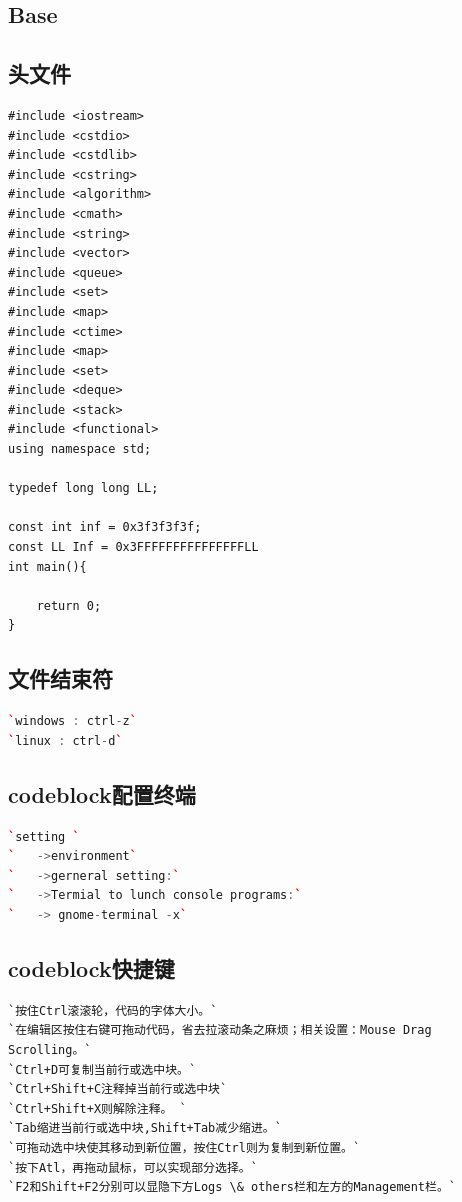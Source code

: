 \documentclass[a4paper]{article}
\begin{document}
\begin{CJK*}{UTF8}{gbsn}
\begin{multicols}{3}
\tableofcontents

\clearpage 

\begin{flushleft} 

% 
%
% 
%


\section{Base}
\subsection{头文件}

\begin{lstlisting}
#include <iostream>
#include <cstdio>
#include <cstdlib>
#include <cstring>
#include <algorithm>
#include <cmath>
#include <string>
#include <vector>
#include <queue>
#include <set>
#include <map>
#include <ctime>
#include <map>
#include <set>
#include <deque>
#include <stack>
#include <functional>
using namespace std;

typedef long long LL;

const int inf = 0x3f3f3f3f;
const LL Inf = 0x3FFFFFFFFFFFFFFFLL
int main(){

    return 0;
}
\end{lstlisting}

\subsection{文件结束符}
\begin{lstlisting}[language={c++}]
`windows : ctrl-z`
`linux : ctrl-d`
\end{lstlisting}

\subsection{codeblock配置终端}
\begin{lstlisting}[language={c++}]
`setting `
`	->environment`
`	->gerneral setting:`
`	->Termial to lunch console programs:`
`	-> gnome-terminal -x`
\end{lstlisting}

\subsection{codeblock快捷键}
\begin{lstlisting}
`按住Ctrl滚滚轮，代码的字体大小。`
`在编辑区按住右键可拖动代码，省去拉滚动条之麻烦；相关设置：Mouse Drag Scrolling。` 
`Ctrl+D可复制当前行或选中块。`
`Ctrl+Shift+C注释掉当前行或选中块`
`Ctrl+Shift+X则解除注释。 `
`Tab缩进当前行或选中块,Shift+Tab减少缩进。`
`可拖动选中块使其移动到新位置，按住Ctrl则为复制到新位置。`
`按下Atl，再拖动鼠标，可以实现部分选择。`
`F2和Shift+F2分别可以显隐下方Logs \& others栏和左方的Management栏。`
\end{lstlisting}


\end{flushleft}
\end{multicols}
\end{CJK*}
\end{document}
